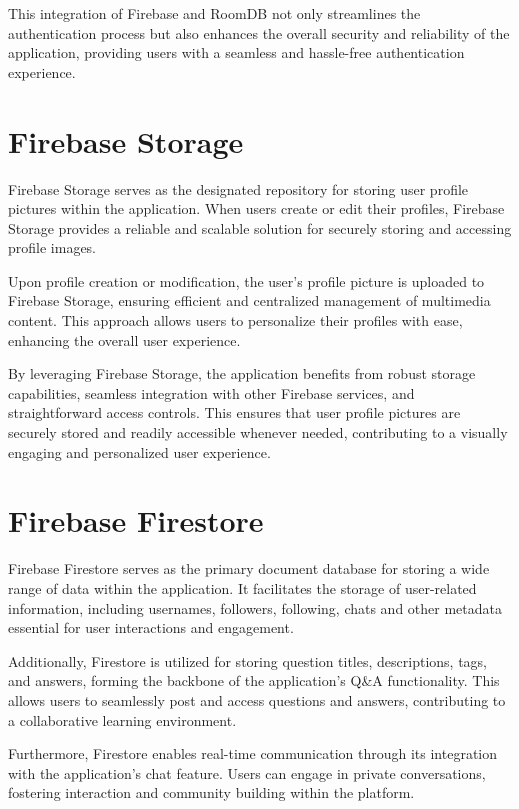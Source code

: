 This integration of Firebase and RoomDB not only streamlines the authentication process but also enhances the overall security and reliability of the application, providing users with a seamless and hassle-free authentication experience.

\section{Firebase Storage}

Firebase Storage serves as the designated repository for storing user profile pictures within the application. When users create or edit their profiles, Firebase Storage provides a reliable and scalable solution for securely storing and accessing profile images.

Upon profile creation or modification, the user's profile picture is uploaded to Firebase Storage, ensuring efficient and centralized management of multimedia content. This approach allows users to personalize their profiles with ease, enhancing the overall user experience.

By leveraging Firebase Storage, the application benefits from robust storage capabilities, seamless integration with other Firebase services, and straightforward access controls. This ensures that user profile pictures are securely stored and readily accessible whenever needed, contributing to a visually engaging and personalized user experience.

\section{Firebase Firestore}

Firebase Firestore serves as the primary document database for storing a wide range of data within the application. It facilitates the storage of user-related information, including usernames, followers, following, chats and other metadata essential for user interactions and engagement.

Additionally, Firestore is utilized for storing question titles, descriptions, tags, and answers, forming the backbone of the application's Q\&A functionality. This allows users to seamlessly post and access questions and answers, contributing to a collaborative learning environment.

Furthermore, Firestore enables real-time communication through its integration with the application's chat feature. Users can engage in private conversations, fostering interaction and community building within the platform.

